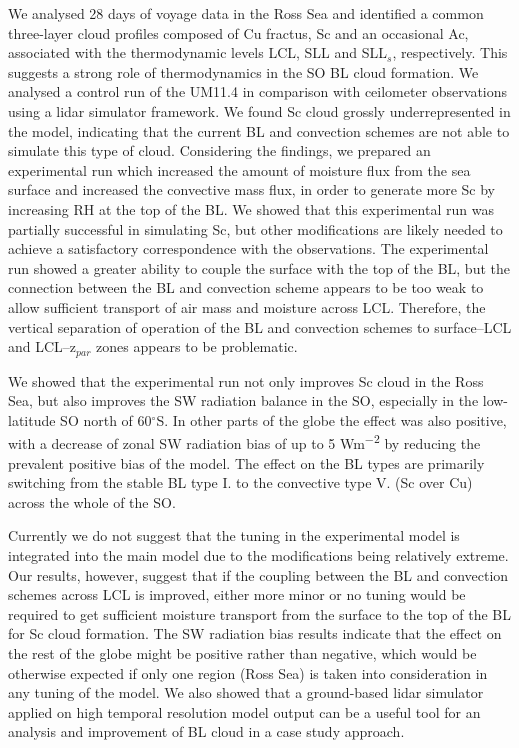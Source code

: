 We analysed 28 days of voyage data in the Ross Sea and identified a common
three-layer cloud profiles composed of Cu fractus, Sc and an occasional
Ac, associated with the thermodynamic levels LCL, SLL and SLL$_s$, respectively.
This suggests a strong role of thermodynamics in the SO BL cloud formation.
We analysed a control run of the UM11.4 in comparison with ceilometer
observations using a lidar simulator framework. We found Sc cloud grossly
underrepresented in the model, indicating that the current BL and convection
schemes are not able to simulate this type of cloud. Considering the findings,
we prepared an experimental run which increased the amount of moisture flux
from the sea surface and increased the convective mass flux, in order to
generate more Sc by increasing RH at the top of the BL. We showed that this
experimental run was partially successful in simulating Sc, but other
modifications are likely needed to achieve a satisfactory correspondence with
the observations. The experimental run showed a greater ability to couple the
surface with the top of the BL, but the connection between the BL and convection
scheme appears to be too weak to allow sufficient transport of air mass and
moisture across LCL. Therefore, the vertical separation of operation of the
BL and convection schemes to surface--LCL and LCL--z$_{par}$ zones appears to
be problematic.

We showed that the experimental run not only improves Sc cloud in the Ross Sea,
but also improves the SW radiation balance in the SO, especially in the
low-latitude SO north of 60$^\circ$S. In other parts of the globe the effect was
also positive, with a decrease of zonal SW radiation bias of up to 5
\unit{Wm^{-2}} by reducing the prevalent positive bias of the model. The
effect on the BL types are primarily switching from the stable BL type I.
to the convective type V. (Sc over Cu) across the whole of the SO.

Currently we do not suggest that the tuning in the experimental model is
integrated into the main model due to the modifications being relatively
extreme. Our results, however, suggest that if the
coupling between the BL and convection schemes across LCL is improved,
either more minor or no tuning would be required to get sufficient moisture
transport from the surface to the top of the BL for Sc cloud formation.
The SW radiation bias results indicate that the effect on the rest of the
globe might be positive rather than negative, which would be otherwise
expected if only one region (Ross Sea) is taken into consideration in any
tuning of the model. We also showed that a ground-based lidar simulator
applied on high temporal resolution model output can be a useful tool for an
analysis and improvement of BL cloud in a case study approach.

